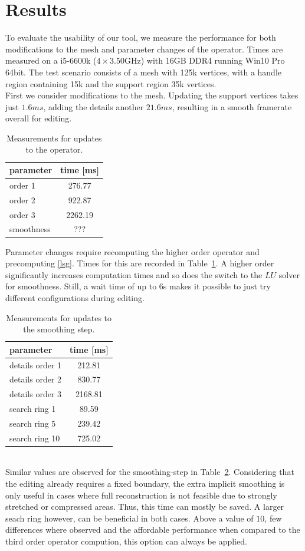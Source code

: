 \documentclass[twocolumn]{article}
\begin{document}
\section{Results}
To evaluate the usability of our tool, we measure the performance for both modifications to the mesh and parameter changes of the operator.
Times are measured on a i5-6600k ($4 \times 3.50$GHz) with 16GB DDR4 running Win10 Pro 64bit.
The test scenario consists of a mesh with 125k vertices, with a handle region containing 15k and the support region 35k vertices. \\
First we consider modifications to the mesh. Updating the support vertices takes just $1.6\si{ms}$, adding the details another $21.6\si{ms}$, resulting in a smooth framerate overall for editing.
\begin{table}
	\centering
	\caption{Measurements for updates to the operator.}
	\begin{tabular}{lc}
		parameter & time [ms] \\
		\hline
		order 1 & 276.77 \\
		order 2 & 922.87 \\
		order 3 & 2262.19 \\
		smoothness & ??? \\
		\hline
	\end{tabular}
	\label{tab:order}
\end{table}
Parameter changes require recomputing the higher order operator and precomputing \eqref{lsg}. Times for this are recorded in Table~\ref{tab:order}. A higher order significantly increases computation times and so does the switch to the $LU$ solver for smoothness. Still, a wait time of up to 6s makes it possible to just try different configurations during editing.
\begin{table}
	\centering
	\caption{Measurements for updates to the smoothing step.}
	\begin{tabular}{lc}
		parameter & time [ms] \\
		\hline
		details order 1 & 212.81 \\
		details order 2 & 830.77 \\
		details order 3 & 2168.81 \\
		search ring 1 & 89.59 \\
		search ring 5 & 239.42 \\
		search ring 10 & 725.02 \\
		\hline
	\end{tabular}
	\label{tab:smoothing}
\end{table}\\
Similar values are observed for the smoothing-step in Table~\ref{tab:smoothing}.
Considering that the editing already requires a fixed boundary, the extra implicit smoothing is only useful in cases where full reconstruction is not feasible due to strongly stretched or compressed areas. Thus, this time can mostly be saved. A larger seach ring however, can be beneficial in both cases. Above a value of $10$, few differences where observed and the affordable performance when compared to the third order operator compution, this option can always be applied.


\end{document}
